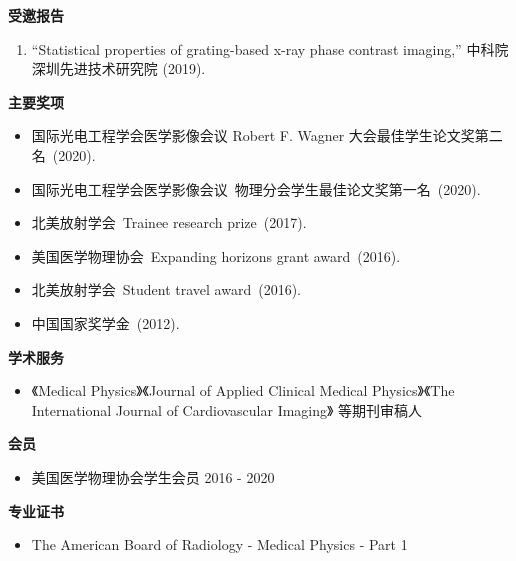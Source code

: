 \documentclass[letterpaper,11pt]{article}
\newcommand{\resheading}[1]{{\large \colorbox{mygrey}{\begin{minipage}{\textwidth}{\textbf{#1 \vphantom{p\^{E}}}}\end{minipage}}}}
\begin{document}
\begin{CJK}{UTF8}{song}
\resheading {受邀报告}
\begin{enumerate}\justifying
\item ``Statistical properties of grating-based x-ray phase contrast imaging,'' 中科院深圳先进技术研究院 (2019).
\end{enumerate}
\resheading{主要奖项}
\begin{itemize}\justifying
\item 国际光电工程学会医学影像会议 Robert F. Wagner 大会最佳学生论文奖第二名~(2020).
\item 国际光电工程学会医学影像会议~物理分会学生最佳论文奖第一名~(2020).
\item 北美放射学会~Trainee research prize~(2017).
\item 美国医学物理协会~Expanding horizons grant award~(2016).
\item 北美放射学会~Student travel award~(2016).
\item 中国国家奖学金~(2012).
\end{itemize}
\resheading{学术服务}
\begin{itemize}
\item 《Medical Physics》《Journal of Applied Clinical Medical Physics》《The International Journal of Cardiovascular Imaging》 等期刊审稿人
\end{itemize}
\resheading{会员}
\begin{itemize}
\item 美国医学物理协会学生会员 \cftdotfill{\cftdotsep} 2016 - 2020
\end{itemize}
\resheading{专业证书}
\begin{itemize}
\item The American Board of Radiology - Medical Physics - Part 1
\end{itemize}
\end{CJK}
\end{document}
